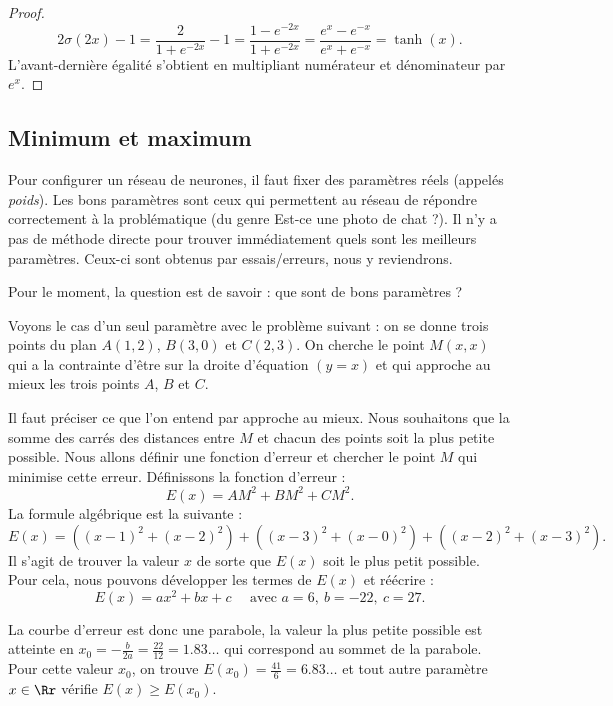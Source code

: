 \documentclass[11pt,class=report,crop=false]{standalone}
\begin{document}
\begin{proof}
$$2\sigma(2x)-1
= \frac{2}{1+e^{-2x}} - 1
= \frac{1-e^{-2x}}{1+e^{-2x}}
= \frac{e^{x}-e^{-x}}{e^{x}+e^{-x}}
= \tanh(x).$$
L'avant-dernière égalité s'obtient en multipliant numérateur et dénominateur par $e^x$.
\end{proof}


\subsection{Minimum et maximum}


Pour configurer un réseau de neurones, il faut fixer des paramètres réels (appelés \emph{poids}). Les bons paramètres sont ceux qui permettent au réseau de répondre correctement à la problématique (du genre \og{}Est-ce une photo de chat ?\fg{}). Il n'y a pas de méthode directe pour trouver immédiatement quels sont les meilleurs paramètres. Ceux-ci sont obtenus par essais/erreurs, nous y reviendrons.

Pour le moment, la question est de savoir : que sont de \og{}bons\fg{} paramètres ?



Voyons le cas d'un seul paramètre avec le problème suivant :
on se donne trois points du plan $A(1,2)$, $B(3,0)$ et $C(2,3)$. On cherche le point 
$M(x,x)$ qui a la contrainte d'être sur la droite d'équation $(y=x)$  et qui approche au mieux les trois points $A$, $B$ et $C$. 



Il faut préciser ce que l'on entend par \og{}approche au mieux\fg{}. Nous souhaitons que la somme des carrés des distances entre $M$ et chacun des points soit la plus petite possible. Nous allons définir une fonction d'erreur et chercher le point $M$ qui minimise cette erreur. 
Définissons la fonction d'erreur :
$$E(x) = AM^2 + BM^2 + CM^2.$$
La formule algébrique est la suivante :
$$E(x) = \left((x-1)^2+(x-2)^2\right)+\left((x-3)^2+(x-0)^2\right)+\left((x-2)^2+(x-3)^2\right).$$
Il s'agit de trouver la valeur $x$ de sorte que $E(x)$ soit le plus petit possible.
Pour cela, nous pouvons développer les termes de $E(x)$ et réécrire :
$$E(x) = ax^2+bx+c \quad \text{ avec } a = 6,\  b = -22,\  c = 27.$$ 


La courbe d'erreur est donc une parabole, la valeur la plus petite possible est atteinte en $x_0 = -\frac{b}{2a} = \frac{22}{12}=1.83\ldots$ qui correspond au sommet de la parabole.
Pour cette valeur $x_0$, on trouve $E(x_0)=\frac{41}{6} = 6.83\ldots$ et tout autre paramètre $x\in\Rr$ vérifie $E(x) \ge E(x_0)$.
\end{document}
